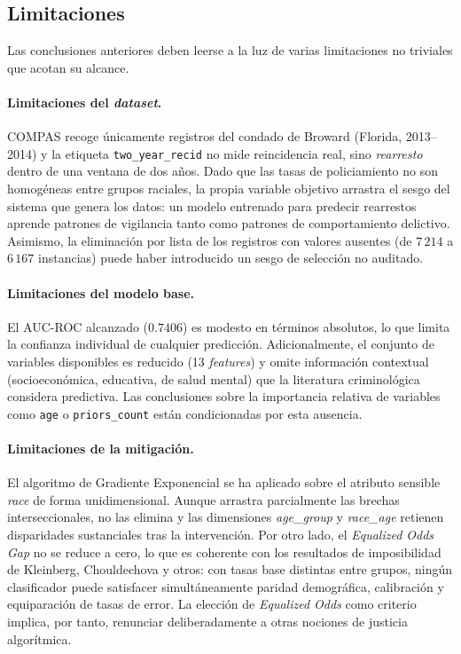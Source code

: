 \documentclass[11pt,a4paper]{article}
\begin{document}
\subsection{Limitaciones}

Las conclusiones anteriores deben leerse a la luz de varias limitaciones no triviales que acotan su alcance.

\paragraph{Limitaciones del \textit{dataset}.} COMPAS recoge únicamente registros del condado de Broward (Florida, 2013--2014) y la etiqueta \texttt{two\_year\_recid} no mide reincidencia real, sino \emph{rearresto} dentro de una ventana de dos años. Dado que las tasas de policiamiento no son homogéneas entre grupos raciales, la propia variable objetivo arrastra el sesgo del sistema que genera los datos: un modelo entrenado para predecir rearrestos aprende patrones de vigilancia tanto como patrones de comportamiento delictivo. Asimismo, la eliminación por lista de los registros con valores ausentes (de $7\,214$ a $6\,167$ instancias) puede haber introducido un sesgo de selección no auditado.

\paragraph{Limitaciones del modelo base.} El AUC-ROC alcanzado ($0.7406$) es modesto en términos absolutos, lo que limita la confianza individual de cualquier predicción. Adicionalmente, el conjunto de variables disponibles es reducido (13 \textit{features}) y omite información contextual (socioeconómica, educativa, de salud mental) que la literatura criminológica considera predictiva. Las conclusiones sobre la importancia relativa de variables como \texttt{age} o \texttt{priors\_count} están condicionadas por esta ausencia.

\paragraph{Limitaciones de la mitigación.} El algoritmo de Gradiente Exponencial se ha aplicado sobre el atributo sensible \textit{race} de forma unidimensional. Aunque arrastra parcialmente las brechas interseccionales, no las elimina y las dimensiones \textit{age\_group} y \textit{race\_age} retienen disparidades sustanciales tras la intervención. Por otro lado, el \textit{Equalized Odds Gap} no se reduce a cero, lo que es coherente con los resultados de imposibilidad de Kleinberg, Chouldechova y otros: con tasas base distintas entre grupos, ningún clasificador puede satisfacer simultáneamente paridad demográfica, calibración y equiparación de tasas de error. La elección de \textit{Equalized Odds} como criterio implica, por tanto, renunciar deliberadamente a otras nociones de justicia algorítmica.
\end{document}
